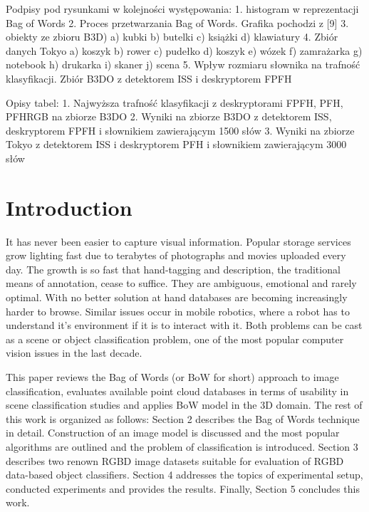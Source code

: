 \documentclass[12pt]{article}
\begin{document}
Podpisy pod rysunkami w kolejności występowania:
1. histogram w reprezentacji Bag of Words
2. Proces przetwarzania Bag of Words. Grafika pochodzi z [9]
3. obiekty ze zbioru B3D) a) kubki b) butelki c) książki d) klawiatury
4. Zbiór danych Tokyo a) koszyk b) rower c) pudełko d) koszyk e) wózek f) zamrażarka g) notebook h) drukarka i) skaner j) scena
5. Wpływ rozmiaru słownika na trafność klasyfikacji. Zbiór B3DO z detektorem ISS i deskryptorem FPFH

Opisy tabel:
1. Najwyższa trafność klasyfikacji z deskryptorami FPFH, PFH, PFHRGB na zbiorze B3DO
2. Wyniki na zbiorze B3DO z detektorem ISS, deskryptorem FPFH i słownikiem zawierającym 1500 słów
3. Wyniki na zbiorze Tokyo z detektorem ISS i deskryptorem PFH i słownikiem zawierającym 3000 słów


\section{ Introduction }

  It has never been easier to capture visual information. Popular storage 
services grow lighting fast due to terabytes of photographs and movies uploaded 
every day. The growth is so fast that hand-tagging and description, the 
traditional means of annotation, cease to suffice. They are ambiguous, 
emotional and rarely optimal. With no better solution at hand databases are 
becoming increasingly harder to browse. Similar issues occur in mobile 
robotics, where a robot has to understand it's environment if it is to interact 
with it. Both problems can be cast as a scene or object classification problem, 
one of the most popular computer vision issues in the last decade. 

  This paper reviews the Bag of Words (or BoW for short) approach to image 
classification, evaluates available point cloud databases in terms of usability 
in scene classification studies and applies BoW model in the 3D domain. The 
rest of this work is organized as follows: Section 2 describes the Bag of Words 
technique in detail. Construction of an image model is discussed and the most 
popular algorithms are outlined and the problem of classification is 
introduced. Section 3 describes two renown RGBD image datasets suitable for 
evaluation of RGBD data-based object classifiers. Section 4 addresses the 
topics of experimental setup, conducted experiments and provides the results. 
Finally, Section 5 concludes this work.
\end{document}
